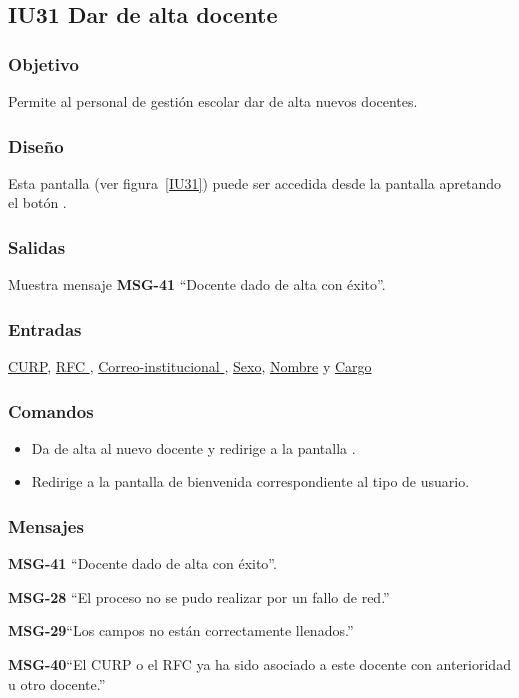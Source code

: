
\subsection{IU31 Dar de alta docente}
\subsubsection{Objetivo}
    Permite al personal de gestión escolar dar de alta nuevos docentes.
\subsubsection{Diseño}
    Esta pantalla  (ver figura~\ref{IU31}) puede ser accedida desde la pantalla  apretando el botón .

\subsubsection{Salidas}
Muestra mensaje {\bf MSG-41} ``Docente dado de alta con éxito''.
\subsubsection{Entradas}
\hyperlink{Docente.CURP }{CURP}, \hyperlink{Docente.RFC }{RFC }, \hyperlink{Docente.Correo-institucional}{ Correo-institucional }, \hyperlink{Docente.Sexo}{Sexo}, \hyperlink{ Docente.Nombre}{Nombre} y \hyperlink{Docente.Cargo}{Cargo}
\subsubsection{Comandos}
\begin{itemize}
    \item {} Da de alta al nuevo docente y redirige a la pantalla .
    \item {} Redirige a la pantalla de bienvenida correspondiente al tipo de usuario.
    
\end{itemize}

\subsubsection{Mensajes}

\begin{Citemize}
    \item {\bf MSG-41} ``Docente dado de alta con éxito''.
    \item {\bf MSG-28}  ``El proceso no se pudo realizar por un fallo de red.''
    \item {\bf MSG-29}{``Los campos no están correctamente llenados.''}
    \item {\bf MSG-40}{``El CURP o el RFC ya ha sido asociado a este docente con anterioridad u otro docente.''}
\end{Citemize}

